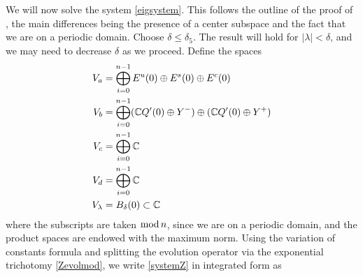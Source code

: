 \documentclass[12pt]{elsarticle}
\theoremstyle{plain}
\theoremstyle{definition}
\theoremstyle{remark}
\numberwithin{theorem}{section}
\numberwithin{equation}{section}
\begin{document}
We will now solve the system \cref{eigsystem}. This follows the outline of the proof of \cite[Theorem 2]{Sandstede1998}, the main differences being the presence of a center subspace and the fact that we are on a periodic domain. Choose $\delta \leq \delta_5$. The result will hold for $|\lambda| < \delta$, and we may need to decrease $\delta$ as we proceed. Define the spaces
\begin{align*}
V_a &= \bigoplus_{i=0}^{n-1} E^u(0) \oplus E^s(0) \oplus E^c(0) \\
V_b &= \bigoplus_{i=0}^{n-1} (\mathbb{C} Q'(0)\oplus Y^-)\oplus(\mathbb{C} Q'(0)\oplus Y^+)\\
V_c &= \bigoplus_{i=0}^{n-1} \mathbb{C} \\
V_d &= \bigoplus_{i=0}^{n-1} \mathbb{C} \\
V_\lambda &= B_\delta(0) \subset \mathbb{C}
\end{align*}
where the subscripts are taken $\mathop\mathrm{mod}\nolimits n$, since we are on a periodic domain, and the product spaces are endowed with the maximum norm. Using the variation of constants formula and splitting the evolution operator via the exponential trichotomy \cref{Zevolmod}, we write \cref{systemZ} in integrated form as
\end{document}
